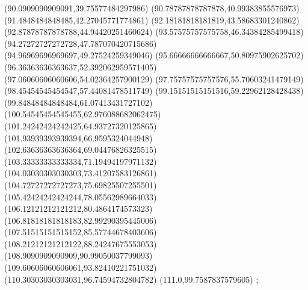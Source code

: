 {(90.0909090909091,39.75577484297986)
(90.78787878787878,40.99383855576973)
(91.4848484848485,42.27045771774861)
(92.18181818181819,43.58683301240862)
(92.87878787878788,44.94420251460624)
(93.57575757575758,46.34384285499418)
(94.27272727272728,47.787070420715686)
(94.96969696969697,49.27524259349046)
(95.66666666666667,50.80975902625702)
(96.36363636363637,52.392062959571405)
(97.06060606060606,54.02364257900129)
(97.75757575757576,55.70603241479149)
(98.45454545454547,57.44081478511749)
(99.15151515151516,59.22962128428438)
(99.84848484848484,61.07413431727102)
(100.54545454545455,62.976088682062475)
(101.24242424242425,64.93727320125865)
(101.93939393939394,66.9595324044948)
(102.63636363636364,69.04476826325515)
(103.33333333333334,71.19494197971132)
(104.03030303030303,73.41207583126861)
(104.72727272727273,75.69825507255501)
(105.42424242424244,78.05562989664033)
(106.12121212121212,80.4864174573323)
(106.81818181818183,82.99290395445006)
(107.51515151515152,85.57744678403606)
(108.21212121212122,88.24247675553053)
(108.9090909090909,90.99050037799093)
(109.60606060606061,93.82410221751032)
(110.30303030303031,96.74594732804782)
(111.0,99.7587837579605)
};
